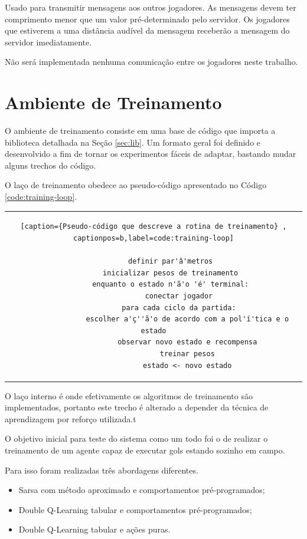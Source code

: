 Usado para transmitir mensagens aos outros jogadores. As mensagens devem ter comprimento menor que um valor pré-determinado pelo servidor. Os jogadores que estiverem a uma distância audível da mensagem receberão a mensagem do servidor imediatamente.

Não será implementada nenhuma comunicação entre os jogadores neste trabalho.


\section{Ambiente de Treinamento}

O ambiente de treinamento consiste em uma base de código que importa a biblioteca detalhada na Seção \ref{sec:lib}. Um formato geral foi definido e desenvolvido a fim de tornar os experimentos fáceis de adaptar, bastando mudar alguns trechos do código.

O laço de treinamento obedece ao pseudo-código apresentado no Código \ref{code:training-loop}.

\begin{tabular}{c}
	\begin{lstlisting}[caption={Pseudo-código que descreve a rotina de treinamento} , captionpos=b,label=code:training-loop]
		
		definir par'â'metros
		inicializar pesos de treinamento
		enquanto o estado n'ã'o 'é' terminal:
			conectar jogador
			para cada ciclo da partida:
				escolher a'ç''ã'o de acordo com a pol'í'tica e o estado
				observar novo estado e recompensa
				treinar pesos
				estado <- novo estado
	\end{lstlisting}
\end{tabular}

O laço interno é onde efetivamente os algoritmos de treinamento são implementados, portanto este trecho é alterado a depender da técnica de aprendizagem por reforço utilizada.t

O objetivo inicial para teste do sistema como um todo foi o de realizar o treinamento de um agente capaz de executar gols estando sozinho em campo.

Para isso foram realizadas três abordagens diferentes.

\begin{itemize}
	\item Sarsa com método aproximado e comportamentos pré-programados;
	\item Double Q-Learning tabular e comportamentos pré-programados;
	\item Double Q-Learning tabular e ações puras.
\end{itemize}

